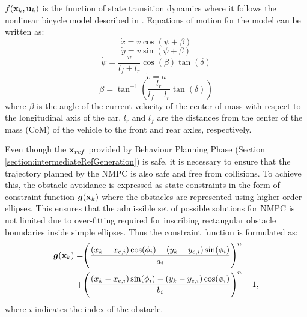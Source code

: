 \documentclass[letterpaper, 10 pt, conference]{ieeeconf}
\begin{document}
$f(\textbf{\text{x}}_k, \textbf{\text{u}}_k)$ is the function of state transition dynamics where it follows the nonlinear bicycle model described in \cite{kongKinematicDynamicVehicle2015a}. Equations of motion for the model can be written as:
\begin{equation} \label{sysmodel1}
\dot{x} = v\cos (\psi + \beta)
\end{equation}
\begin{equation} \label{sysmodel2}
\dot{y} = v\sin (\psi + \beta)
\end{equation}
\begin{equation} \label{sysmodel3}
\dot{\psi} = \frac{v}{l_f+l_r} \cos (\beta) \tan(\delta )
\end{equation}
\begin{equation} \label{sysmodel4}
\dot{v} = a
\end{equation}
\begin{equation} \label{sysmodel5}
\beta = \tan^{-1}\left (\frac{l_r}{l_f+l_r} \tan(\delta)\right )
\end{equation}
where $\beta$ is the angle of the current velocity of the center of mass with respect to the longitudinal axis of the car. \textit{$l_r$} and \textit{$l_f$} are the distances from the center of the mass (CoM) of the vehicle to the front and rear axles, respectively.

Even though the $\textbf{\text{x}}_{ref}$ provided by Behaviour Planning Phase (Section \ref{section:intermediateRefGeneration}) is safe, it is necessary to ensure that the trajectory planned by the NMPC is also safe and free from collisions. To achieve this, the obstacle avoidance is expressed as state constraints in the form of constraint function $\bm{g}(\textbf{\text{x}}_k)$ where the obstacles are represented using higher order ellipses. This ensures that the admissible set of possible solutions for NMPC is not limited due to over-fitting required for inscribing rectangular obstacle boundaries inside simple ellipses. Thus the constraint function is formulated as:
\begin{equation}
\label{Constraint_Function}
\begin{aligned}
\bm{g}(\textbf{\text{x}}_k) = & \Bigg(\frac{(x_k-x_{e,i})\cos(\phi_{i})-(y_k-y_{e,i})\sin(\phi_{i})}{a_{i}}\Bigg)^n\\
+& \Bigg(\frac{(x_k-x_{e,i})\sin(\phi_{i})-(y_k-y_{e,i})\cos(\phi_{i})}{b_{i}}\Bigg)^n-1,
\end{aligned}
\end{equation}
where $i$ indicates the index of the obstacle.
\end{document}
